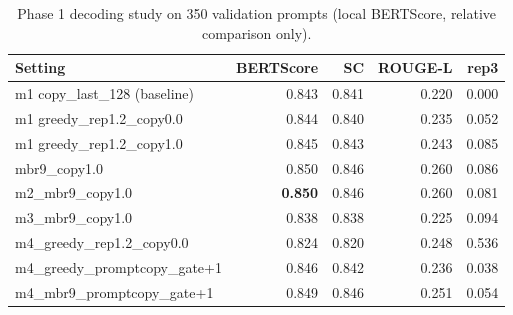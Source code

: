 \begin{table}[t]
\centering\small
\begin{tabular}{lrrrr}
\toprule
Setting & BERTScore & SC & ROUGE-L & rep3 \\
\midrule
m1 copy\_last\_128 (baseline) & 0.843 & 0.841 & 0.220 & 0.000 \\
m1 greedy\_rep1.2\_copy0.0 & 0.844 & 0.840 & 0.235 & 0.052 \\
m1 greedy\_rep1.2\_copy1.0 & 0.845 & 0.843 & 0.243 & 0.085 \\
mbr9\_copy1.0 & 0.850 & 0.846 & 0.260 & 0.086 \\
m2\_mbr9\_copy1.0 & \textbf{0.850} & 0.846 & 0.260 & 0.081 \\
m3\_mbr9\_copy1.0 & 0.838 & 0.838 & 0.225 & 0.094 \\
m4\_greedy\_rep1.2\_copy0.0 & 0.824 & 0.820 & 0.248 & 0.536 \\
m4\_greedy\_promptcopy\_gate+1 & 0.846 & 0.842 & 0.236 & 0.038 \\
m4\_mbr9\_promptcopy\_gate+1 & 0.849 & 0.846 & 0.251 & 0.054 \\
\bottomrule
\end{tabular}
\caption{Phase 1 decoding study on 350 validation prompts (local BERTScore, relative comparison only).}
\label{tab:p1-decoding}
\end{table}
